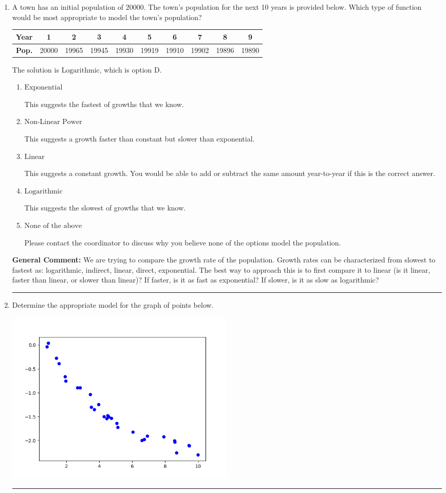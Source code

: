 \documentclass{extbook}[14pt]
\newcommand{\litem}[1]{\item #1

\rule{\textwidth}{0.4pt}}
\begin{document}
\begin{enumerate}\litem{
A town has an initial population of 20000. The town's population for the next 10 years is provided below. Which type of function would be most appropriate to model the town's population?



\begin{tabular}{c|c|c|c|c|c|c|c|c|c}
\textbf{Year} & 1 & 2 & 3 & 4 & 5 & 6 & 7 & 8 & 9 \tabularnewline
\hline
\textbf{Pop.} & 20000 & 19965 & 19945 & 19930 & 19919 & 19910 & 19902 & 19896 & 19890
\end{tabular} 

The solution is \( \text{Logarithmic} \), which is option D.\begin{enumerate}[label=\Alph*.]
\item \( \text{Exponential} \)

This suggests the fastest of growths that we know.
\item \( \text{Non-Linear Power} \)

This suggests a growth faster than constant but slower than exponential.
\item \( \text{Linear} \)

This suggests a constant growth. You would be able to add or subtract the same amount year-to-year if this is the correct answer.
\item \( \text{Logarithmic} \)

This suggests the slowest of growths that we know.
\item \( \text{None of the above} \)

Please contact the coordinator to discuss why you believe none of the options model the population.
\end{enumerate}

\textbf{General Comment:} We are trying to compare the growth rate of the population. Growth rates can be characterized from slowest to fastest as: logarithmic, indirect, linear, direct, exponential. The best way to approach this is to first compare it to linear (is it linear, faster than linear, or slower than linear)? If faster, is it as fast as exponential? If slower, is it as slow as logarithmic?
}
\litem{
Determine the appropriate model for the graph of points below.

\begin{center}
    \includegraphics[width=0.5\textwidth]{../Figures/identifyModelGraph11CopyA.png}
\end{center}




}
\end{enumerate}
\end{document}

